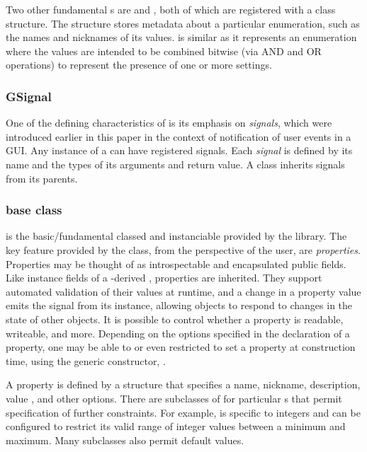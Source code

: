 \documentclass[article,shortnames]{jss}
\begin{document}
Two other fundamental s are
 and , both of which are registered with a
class structure. The  structure stores metadata about
a particular enumeration, such as the names and nicknames of its
values.  is similar as it represents an enumeration
where the values are intended to be combined bitwise (via AND and OR
operations) to represent the presence of one or more settings.

\subsubsection{GSignal}

One of the defining characteristics of  is its emphasis
on \emph{signals}, which were introduced earlier in this paper in the
context of notification of user events in a  GUI. Any
instance of a  can have registered signals. Each
\emph{signal} is defined by its name and the types of its arguments
and return value. A class inherits signals from its parents.

\subsubsection[GObject base class]{ base class}

 is the basic/fundamental classed and instanciable
 provided by the  library.  The key feature
provided by the  class, from the perspective of the
 user, are \emph{properties}. Properties may be thought of
as introspectable and encapsulated public fields. Like instance fields
of a -derived ,
properties
are inherited. They support automated validation of their values at
runtime, and a change in a property value emits the 
signal from its instance, allowing objects to respond to changes in
the state of other objects. It is possible to control whether a
property is readable, writeable, and more. Depending on the options
specified in the declaration of a property,
one may be able to or even restricted to set a property at
construction time, using the generic  constructor,
.

A property is defined by a  structure that specifies
a name, nickname, description, value , and other options.
There are subclasses of  for particular s
that permit specification of further constraints. For example,
 is specific to integers and can be
configured to restrict its valid range of integer values between a
minimum and maximum. Many  subclasses also permit
default values.
\end{document}
